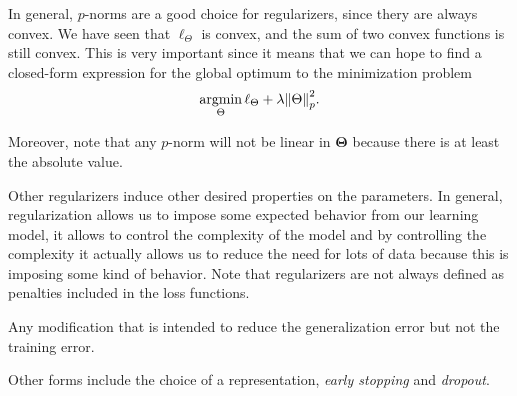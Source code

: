 In general, $p$-norms are a good choice for regularizers, since thery are always convex. We have seen that $\ell_\Theta$ is convex, and the sum of two convex functions is still convex. This is very important since it means that we can hope to find a closed-form expression for the global optimum to the minimization problem
\begin{equation}
    \operatorname*{\operatorname{argmin}}_{\Theta} \ell_\Theta + \lambda \norm{\Theta}_p^2.
\end{equation}

Moreover, note that any $p$-norm will not be linear in $\mathbf{\Theta}$ because there is at least the absolute value.

Other regularizers induce other desired properties on the parameters. In general, regularization allows us to impose some expected behavior from our learning model, it allows to control the complexity of the model and by controlling the complexity it actually allows us to reduce the need for lots of data because this is imposing some kind of behavior. Note that regularizers are not always defined as penalties included in the loss functions.
\begin{defn}[Regularization]
	Any modification that is intended to reduce the generalization error but not the training error.
\end{defn}
Other forms include the choice of a representation, \emph{early stopping} and \emph{dropout}.